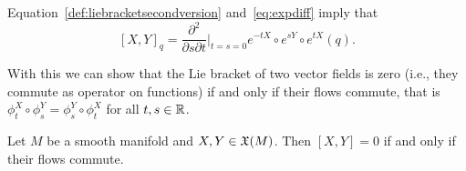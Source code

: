 \begin{remark}
	Equation~\eqref{def:liebracketsecondversion} and~\eqref{eq:expdiff} imply that
	\begin{equation}\label{eq:lbddr}
		[X,Y]_q = \frac{\partial^2}{\partial s \partial t}\Big|_{t=s=0}e^{-tX}\circ e^{sY}\circ e^{t X}(q).
	\end{equation}
\end{remark}

With this we can show that the Lie bracket of two vector fields is zero (i.e., they commute as operator on functions) if and only if their flows commute, that is $\phi^X_t \circ \phi^Y_s = \phi^Y_s\circ \phi^X_t$ for all $t,s\in\mathbb{R}$.

\begin{proposition}
	Let $M$ be a smooth manifold and $X,Y\in\mathfrak{X}(M)$. Then $[X,Y]=0$ if and only if their flows commute.
\end{proposition}
